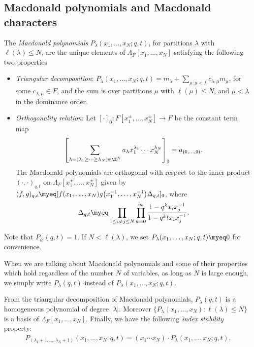 \subsection{Macdonald polynomials and Macdonald characters}\label{macdonaldpolysection}

\begin{dfprop}\label{def:macdonaldpolys}
The \textit{Macdonald polynomials} $P_{\lambda}(x_1, \dots, x_N; q, t)$, for partitions $\lambda$ with $\ell(\lambda) \leq N$, are the unique elements of $\Lambda_F[x_1, \dots, x_N]$ satisfying the following two properties
\begin{itemize}\itemsep=0pt
	\item \textit{Triangular decomposition}: $\displaystyle P_{\lambda}(x_1, \dots, x_N; q, t) = m_{\lambda} + \sum\limits_{\mu\colon \mu < \lambda}{c_{\lambda, \mu}m_{\mu}}$, for some $c_{\lambda, \mu}\in F$, and the sum is over partitions $\mu$ with $\ell(\mu) \leq N$, and $\mu < \lambda$ in the dominance order.

	\item \textit{Orthogonality relation}: Let $[\cdot]_0 \colon F[x_1^{\pm}, \dots, x_N^{\pm}] \rightarrow F$ be the constant term map
\begin{gather*}
\left[ \sum_{\lambda = (\lambda_1 \geq \cdots \geq \lambda_N) \in \Z^N}{a_{\lambda}x_1^{\lambda_1}\cdots x_N^{\lambda_N}} \right]_0 = a_{(0, \dots, 0)}.
\end{gather*}
The Macdonald polynomials are orthogonal with respect to the inner product $(\cdot, \cdot)_{q, t}$ on $\Lambda_F[x_1^{\pm}, \dots, x_N^{\pm}]$ given by $\displaystyle (f, g)_{q, t} \myeq [f(x_1, \dots, x_N)g\big(x_1^{-1}, \dots, x_N^{-1}\big)\Delta_{q, t}]_0$, where
\[
\Delta_{q, t} \myeq \prod_{1\leq i\neq j\leq N}\prod_{k=0}^{\infty}{\frac{1 - q^{k}x_ix_j^{-1}}{1 - q^{k}tx_ix_j^{-1}}}.
\]
\end{itemize}
\end{dfprop}

Note that $P_{\varnothing}(q, t) = 1$. If $N < \ell(\lambda)$, we set $P_{\lambda}(x_1, \dots, x_N; q, t) \myeq 0$ for convenience.

When we are talking about Macdonald polynomials and some of their properties which hold regardless of the number $N$ of variables, as long as $N$ is large enough, we simply write $P_{\lambda}(q, t)$ instead of $P_{\lambda}(x_1, \dots, x_N; q, t)$.

From the triangular decomposition of Macdonald polynomials, $P_{\lambda}(q, t)$ is a homogeneous polynomial of degree $|\lambda|$. Moreover $\{P_{\lambda}(x_1, \dots, x_N) \colon \ell(\lambda) \leq N\}$ is a basis of $\Lambda_F[x_1, \dots, x_N]$. Finally, we have the following \textit{index stability} property:
\begin{gather}\label{macdonaldsignatures1}
P_{(\lambda_1 + 1, \dots, \lambda_N + 1)}(x_1, \dots, x_N; q, t) = (x_1\cdots x_N)\cdot P_{\lambda}(x_1, \dots, x_N; q, t).
\end{gather}

